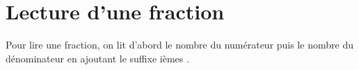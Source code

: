\documentclass[a4paper,10pt]{report}
\begin{document}


\vspace{-2cm}
\section{Lecture d'une fraction}

\begin{prop}
Pour lire une fraction, on lit d'abord le nombre du numérateur puis le nombre du dénominateur en ajoutant le suffixe \og ièmes \fg{}.
\end{prop}
\end{document}
